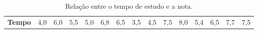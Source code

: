 \documentclass[12pt,portuguese,oneside]{book}
\begin{document}
\begin{longtable}[]{@{}lllllllllllllll@{}}
\caption{\label{tab:reg1}Relação entre o tempo de estudo e a
nota.}\tabularnewline
\toprule
\begin{minipage}[b]{0.10\columnwidth}\raggedright\strut
\textbf{Tempo}\strut
\end{minipage} & \begin{minipage}[b]{0.04\columnwidth}\raggedright\strut
4,0\strut
\end{minipage} & \begin{minipage}[b]{0.04\columnwidth}\raggedright\strut
6,0\strut
\end{minipage} & \begin{minipage}[b]{0.04\columnwidth}\raggedright\strut
5,5\strut
\end{minipage} & \begin{minipage}[b]{0.04\columnwidth}\raggedright\strut
5,0\strut
\end{minipage} & \begin{minipage}[b]{0.04\columnwidth}\raggedright\strut
6,8\strut
\end{minipage} & \begin{minipage}[b]{0.04\columnwidth}\raggedright\strut
6,5\strut
\end{minipage} & \begin{minipage}[b]{0.04\columnwidth}\raggedright\strut
3,5\strut
\end{minipage} & \begin{minipage}[b]{0.04\columnwidth}\raggedright\strut
4,5\strut
\end{minipage} & \begin{minipage}[b]{0.04\columnwidth}\raggedright\strut
7,5\strut
\end{minipage} & \begin{minipage}[b]{0.04\columnwidth}\raggedright\strut
8,0\strut
\end{minipage} & \begin{minipage}[b]{0.04\columnwidth}\raggedright\strut
5,4\strut
\end{minipage} & \begin{minipage}[b]{0.04\columnwidth}\raggedright\strut
6,5\strut
\end{minipage} & \begin{minipage}[b]{0.04\columnwidth}\raggedright\strut
7,7\strut
\end{minipage} & \begin{minipage}[b]{0.04\columnwidth}\raggedright\strut
7,5\strut
\end{minipage}\tabularnewline

\end{longtable}
\end{document}
